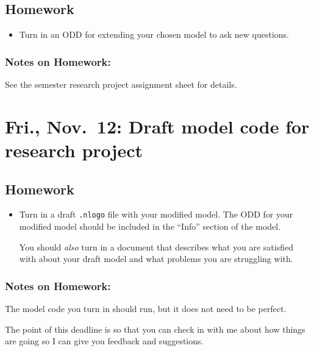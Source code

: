 \documentclass[
]{article}
\providecommand{\tightlist}{%
  \setlength{\itemsep}{0pt}\setlength{\parskip}{0pt}}
\begin{document}
\hypertarget{homework-13}{%
\subsection{Homework}\label{homework-13}}

\begin{itemize}
\tightlist
\item
  Turn in an ODD for extending your chosen model to ask new questions.
\end{itemize}

\hypertarget{notes-on-homework-9}{%
\subsubsection{Notes on Homework:}\label{notes-on-homework-9}}

See the semester research project assignment sheet for details.

\hypertarget{fri.-nov.-12-draft-model-code-for-research-project}{%
\section{Fri., Nov.~12: Draft model code for research
project}\label{fri.-nov.-12-draft-model-code-for-research-project}}

\hypertarget{homework-14}{%
\subsection{Homework}\label{homework-14}}

\begin{itemize}
\item
  Turn in a draft \texttt{.nlogo} file with your modified model. The ODD
  for your modified model should be included in the ``Info'' section of
  the model.

  You should \emph{also} turn in a document that describes what you are
  satisfied with about your draft model and what problems you are
  struggling with.
\end{itemize}

\hypertarget{notes-on-homework-10}{%
\subsubsection{Notes on Homework:}\label{notes-on-homework-10}}

The model code you turn in should run, but it does not need to be
perfect.

The point of this deadline is so that you can check in with me about how
things are going so I can give you feedback and suggestions.
\end{document}

